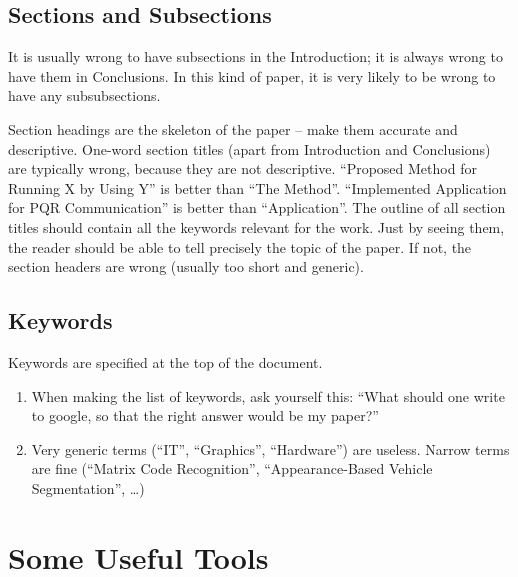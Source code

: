 \documentclass{ExcelAtFIT}
\begin{document}
\subsection{Sections and Subsections}
\label{sec:Sections}

It is usually wrong to have subsections in the Introduction; it is always wrong to have them in Conclusions.  In this kind of paper, it is very likely to be wrong to have any subsubsections.

Section headings are the skeleton of the paper -- make them accurate and descriptive.  One-word section titles (apart from Introduction and Conclusions) are typically wrong, because they are not descriptive.  
``Proposed Method for Running X by Using Y'' is better than ``The Method''.
``Implemented Application for PQR Communication'' is better than ``Application''.  The outline of all section titles should contain all the keywords relevant for the work.  Just by seeing them, the reader should be able to tell precisely the topic of the paper.  If not, the section headers are wrong (usually too short and generic).

\subsection{Keywords}
\label{sec:Keywords}

Keywords are specified at the top of the document.  
\begin{enumerate}[noitemsep]
	\item When making the list of keywords, ask yourself this: ``What should one write to google, so that the right answer would be my paper?''
	\item Very generic terms (``IT'', ``Graphics'', ``Hardware'') are useless. Narrow terms are fine (``Matrix Code Recognition'', ``Appearance-Based Vehicle Segmentation'', \ldots)
\end{enumerate}

\section{Some Useful Tools}
\label{sec:UsefulTools}
\end{document}
